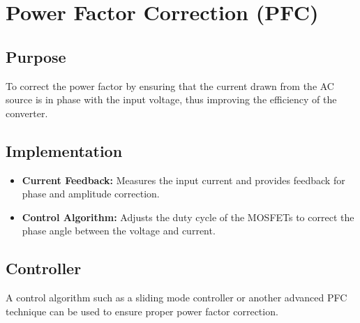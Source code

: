 \documentclass{article}
\begin{document}
\section{Power Factor Correction (PFC)}
\label{sec:power_factor_correction}
\subsection{Purpose}
To correct the power factor by ensuring that the current drawn from the AC source is in phase with the input voltage, thus improving the efficiency of the converter.

\subsection{Implementation}
\begin{itemize}
    \item \textbf{Current Feedback:} Measures the input current and provides feedback for phase and amplitude correction.
    \item \textbf{Control Algorithm:} Adjusts the duty cycle of the MOSFETs to correct the phase angle between the voltage and current.
\end{itemize}

\subsection{Controller}
A control algorithm such as a sliding mode controller or another advanced PFC technique can be used to ensure proper power factor correction.
\end{document}
